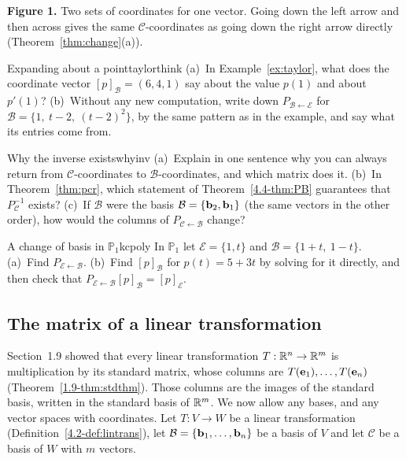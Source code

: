 \documentclass[11pt]{article}
\begin{document}
\noindent\textbf{Figure 1.} Two sets of coordinates for one vector. Going down the left arrow and then across gives the same $\mathcal{C}$-coordinates as going down the right arrow directly (Theorem~\ref{thm:change}(a)).

\begin{think}{Expanding about a point}{taylorthink}
(a)~In Example~\ref{ex:taylor}, what does the coordinate vector $[p]_{\mathcal{B}}=(6,4,1)$ say about the value $p(1)$ and about $p'(1)$? (b)~Without any new computation, write down $P_{\mathcal{B}\leftarrow\mathcal{E}}$ for $\mathcal{B}=\{1,\ t-2,\ (t-2)^2\}$, by the same pattern as in the example, and say what its entries come from.
\end{think}

\begin{think}{Why the inverse exists}{whyinv}
(a)~Explain in one sentence why you can always return from $\mathcal{C}$-coordinates to $\mathcal{B}$-coordinates, and which matrix does it. (b)~In Theorem~\ref{thm:pcr}, which statement of Theorem~\ref{4.4-thm:PB} guarantees that $P_{\mathcal{C}}^{-1}$ exists? (c)~If $\mathcal{B}$ were the basis $\mathcal{B}=\{\mathbf{b}_2,\mathbf{b}_1\}$ (the same vectors in the other order), how would the columns of $P_{\mathcal{C}\leftarrow\mathcal{B}}$ change?
\end{think}

\begin{kc}{A change of basis in $\mathbb{P}_1$}{kcpoly}
In $\mathbb{P}_1$ let $\mathcal{E}=\{1,t\}$ and $\mathcal{B}=\{1+t,\ 1-t\}$. (a)~Find $P_{\mathcal{E}\leftarrow\mathcal{B}}$. (b)~Find $[p]_{\mathcal{B}}$ for $p(t)=5+3t$ by solving for it directly, and then check that $P_{\mathcal{E}\leftarrow\mathcal{B}}[p]_{\mathcal{B}}=[p]_{\mathcal{E}}$.
\end{kc}

\subsection*{The matrix of a linear transformation}

Section~1.9 showed that every linear transformation $T:\mathbb{R}^n\to\mathbb{R}^m$ is multiplication by its standard matrix, whose columns are $T(\mathbf{e}_1),\dots,T(\mathbf{e}_n)$ (Theorem~\ref{1.9-thm:stdthm}). Those columns are the images of the standard basis, written in the standard basis of $\mathbb{R}^m$. We now allow any bases, and any vector spaces with coordinates. Let $T:V\to W$ be a linear transformation (Definition~\ref{4.2-def:lintrans}), let $\mathcal{B}=\{\mathbf{b}_1,\dots,\mathbf{b}_n\}$ be a basis of $V$ and let $\mathcal{C}$ be a basis of $W$ with $m$ vectors.
\end{document}
